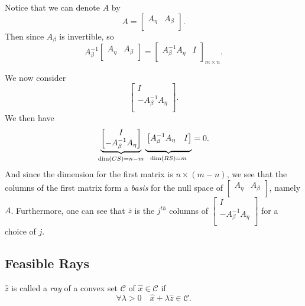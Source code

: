 \begin{note}
	Notice that we can denote \(A\) by
	\[
		A = \begin{bmatrix}
			A_{\eta} & A_{\beta} \\
		\end{bmatrix}.
	\]
	Then since \(A_{\beta}\) is invertible, so
	\[
		A^{-1}_{\beta}\begin{bmatrix}
			A_{\eta} & A_{\beta} \\
		\end{bmatrix} = \begin{bmatrix}
			A^{-1}_{\beta}A_{\eta} & I \\
		\end{bmatrix}_{m\times n}.
	\]

	We now consider
	\[
		\begin{bmatrix}
			I                       \\
			-A^{-1}_{\beta}A_{\eta} \\
		\end{bmatrix}.
	\]
	We then have
	\[
		\underbrace{
			\begin{bmatrix}
				I                       \\
				-A^{-1}_{\beta}A_{\eta} \\
			\end{bmatrix}}_{\dim(CS) = n-m}\underbrace{\vphantom{\begin{bmatrix}
					\\ \\
				\end{bmatrix}}\begin{bmatrix}
				A^{-1}_{\beta}A_{\eta} & I \\
			\end{bmatrix}}_{\dim(RS)=m} = 0.
	\]
	And since the dimension for the first matrix is \(n\times (m-n)\), we see that the columns of the first matrix form a \emph{basis} for the null space of \(\begin{bmatrix}
		A_{\eta} & A_{\beta} \\
	\end{bmatrix}\), namely \(A\). Furthermore, one can see that \(\overline{z}\) is the \(j^{th}\) columns of \(\begin{bmatrix}
		I                       \\
		-A^{-1}_{\beta}A_{\eta} \\
	\end{bmatrix}\) for a choice of \(j\).
\end{note}

\subsection{Feasible Rays}
\begin{definition}
	\(\hat{z}\) is called a \emph{ray} of a convex set \(\mathcal{C}\) of \(\hat{x}\in \mathcal{C}\) if
	\[
		\forall \lambda>0\quad \hat{x} + \lambda \hat{z} \in \mathcal{C}.
	\]
\end{definition}

